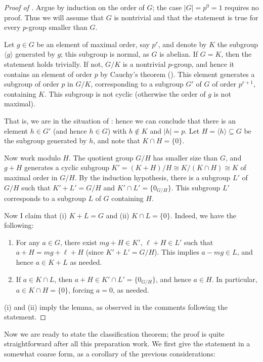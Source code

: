 \begin{proof}[Proof of ]
  Argue by induction on the order of $G$; the case $|G| = p^0 = 1$
  requires no proof. Thus we will assume that $G$ is nontrivial and
  that the statement is true for every $p$-group smaller than $G$.

  Let $g \in G$ be an element of maximal order, say $p^r$, and denote
  by $K$ the subgroup $\langle g \rangle$ generated by $g$; this
  subgroup is normal, as $G$ is abelian. If $G = K$, then the
  statement holds trivially. If not, $G/K$ is a nontrivial $p$-group,
  and hence it contains an element of order $p$ by Cauchy's theorem
  (). This element generates a subgroup of
  order $p$ in $G/K$, corresponding to a subgroup $G'$ of $G$ of order
  $p^{r+1}$, containing $K$. This subgroup is not cyclic (otherwise
  the order of $g$ is not maximal).

  That is, we are in the situation of : hence we
  can conclude that there is an element $h \in G'$ (and hence
  $h \in G$) with $h \notin K$ and $|h| = p$. Let
  $H = \langle h \rangle \subseteq G$ be the subgroup generated by
  $h$, and note that $K \cap H = \{0\}$.

  Now work modulo $H$. The quotient group $G/H$ has smaller size than
  $G$, and $g + H$ generates a cyclic subgroup
  $K' = (K + H)/H \cong K/(K \cap H) \cong K$ of maximal order in
  $G/H$. By the induction hypothesis, there is a subgroup $L'$ of
  $G/H$ such that $K' + L' = G/H$ and $K' \cap L' = \{0_{G/H}\}$. This
  subgroup $L'$ corresponds to a subgroup $L$ of $G$ containing $H$.

  Now I claim that (i) $K + L = G$ and (ii) $K \cap L =
  \{0\}$. Indeed, we have the following:
  \begin{enumerate}[label=(\roman*)]
  \item For any $a \in G$, there exist $mg + H \in K'$,
    $\ell + H \in L'$ such that $a + H = mg + \ell + H$ (since
    $K' + L' = G/H$). This implies $a - mg \in L$, and hence
    $a \in K + L$ as needed.
  \item If $a \in K \cap L$, then
    $a + H \in K' \cap L' = \{0_{G/H}\}$, and hence $a \in H$. In
    particular, $a \in K \cap H = \{0\}$, forcing $a = 0$, as needed.
  \end{enumerate}
  (i) and (ii) imply the lemma, as observed in the comments following
  the statement.
\end{proof}
Now we are ready to state the classification theorem; the proof is
quite straightforward after all this preparation work. We first give
the statement in a somewhat coarse form, as a corollary of the
previous considerations:

